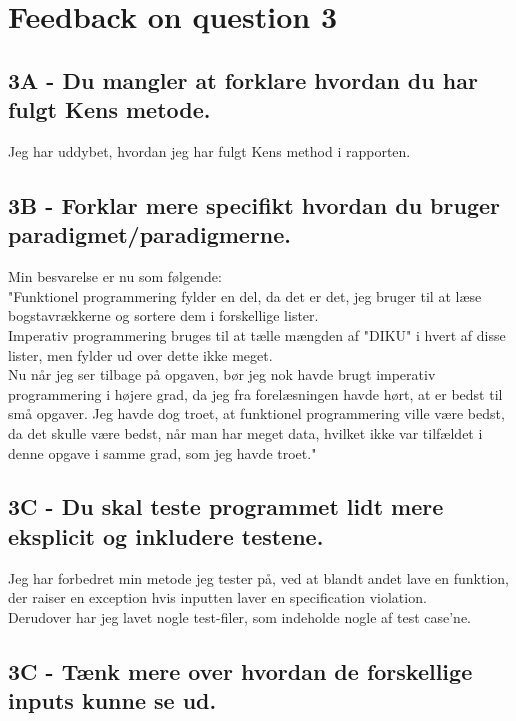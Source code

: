 \documentclass[a4paper,12pt]{article}
\begin{document}
\section{Feedback on question 3}

\subsection*{3A - Du mangler at forklare hvordan du har fulgt Kens metode.}

Jeg har uddybet, hvordan jeg har fulgt Kens method i rapporten.

\subsection*{3B - Forklar mere specifikt hvordan du bruger paradigmet/paradigmerne.}

Min besvarelse er nu som følgende:\\
"Funktionel programmering fylder en del, da det er det, jeg bruger til at læse bogstavrækkerne og sortere dem i forskellige lister.\\
Imperativ programmering bruges til at tælle mængden af "DIKU" i hvert af disse lister, men fylder ud over dette ikke meget.\\
Nu når jeg ser tilbage på opgaven, bør jeg nok havde brugt imperativ programmering i højere grad, da jeg fra forelæsningen havde hørt, at er bedst til små opgaver. Jeg havde dog troet, at funktionel programmering ville være bedst, da det skulle være bedst, når man har meget data, hvilket ikke var tilfældet i denne opgave i samme grad, som jeg havde troet."


\subsection*{3C - Du skal teste programmet lidt mere eksplicit og inkludere testene.}

Jeg har forbedret min metode jeg tester på, ved at blandt andet lave en funktion, der raiser en exception hvis inputten laver en specification violation.\\
Derudover har jeg lavet nogle test-filer, som indeholde nogle af test case'ne.

\subsection*{3C - Tænk mere over hvordan de forskellige inputs kunne se ud.}
\end{document}
